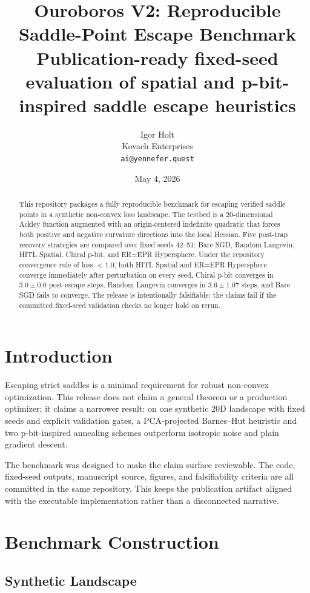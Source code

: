 \documentclass[11pt]{article}
\title{\textbf{Ouroboros V2: Reproducible Saddle-Point Escape Benchmark}\\
\large Publication-ready fixed-seed evaluation of spatial and p-bit-inspired saddle escape heuristics}
\author{Igor Holt\\Kovach Enterprises\\\texttt{ai@yennefer.quest}}
\date{May 4, 2026}
\begin{document}
\maketitle

\begin{abstract}
This repository packages a fully reproducible benchmark for escaping verified saddle points in a synthetic non-convex loss landscape. The testbed is a 20-dimensional Ackley function augmented with an origin-centered indefinite quadratic that forces both positive and negative curvature directions into the local Hessian. Five post-trap recovery strategies are compared over fixed seeds 42--51: Bare SGD, Random Langevin, HITL Spatial, Chiral p-bit, and ER=EPR Hypersphere. Under the repository convergence rule of loss \(< 1.0\), both HITL Spatial and ER=EPR Hypersphere converge immediately after perturbation on every seed, Chiral p-bit converges in \(3.0 \pm 0.0\) post-escape steps, Random Langevin converges in \(3.6 \pm 1.07\) steps, and Bare SGD fails to converge. The release is intentionally falsifiable: the claims fail if the committed fixed-seed validation checks no longer hold on rerun.
\end{abstract}

\section{Introduction}

Escaping strict saddles is a minimal requirement for robust non-convex optimization. This release does not claim a general theorem or a production optimizer; it claims a narrower result: on one synthetic 20D landscape with fixed seeds and explicit validation gates, a PCA-projected Barnes--Hut heuristic and two p-bit-inspired annealing schemes outperform isotropic noise and plain gradient descent.

The benchmark was designed to make the claim surface reviewable. The code, fixed-seed outputs, manuscript source, figures, and falsifiability criteria are all committed in the same repository. This keeps the publication artifact aligned with the executable implementation rather than a disconnected narrative.

\section{Benchmark Construction}

\subsection{Synthetic Landscape}
\end{document}
